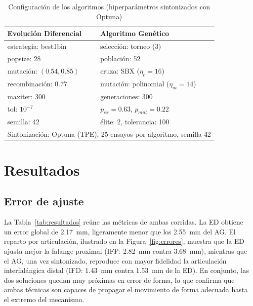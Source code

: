 \documentclass[conference]{IEEEtran}
\begin{document}
\begin{table}[htbp]
\caption{Configuración de los algoritmos (hiperparámetros sintonizados con Optuna)}
\begin{center}
\begin{tabular}{|l|l|}
\hline
\textbf{Evolución Diferencial} & \textbf{Algoritmo Genético} \\
\hline
estrategia: best1bin & selección: torneo (3) \\
\hline
popsize: 28 & población: 52 \\
\hline
mutación: $(0.54,0.85)$ & cruza: SBX ($\eta_c=16$) \\
\hline
recombinación: 0.77 & mutación: polinomial ($\eta_m=14$) \\
\hline
maxiter: 300 & generaciones: 300 \\
\hline
tol: $10^{-7}$ & $p_{cx}=0.63$, $p_{mut}=0.22$ \\
\hline
semilla: 42 & élite: 2, tolerancia: 100 \\
\hline
\multicolumn{2}{|l|}{Sintonización: Optuna (TPE), 25 ensayos por algoritmo, semilla 42} \\
\hline
\end{tabular}
\label{tab:config}
\end{center}
\end{table}

\section{Resultados}
\subsection{Error de ajuste}
La Tabla~\ref{tab:resultados} reúne las métricas de ambas corridas. La ED obtiene
un error global de 2.17~mm, ligeramente menor que los 2.55~mm del AG. El reparto
por articulación, ilustrado en la Figura~\ref{fig:errores}, muestra que la ED
ajusta mejor la falange proximal (IFP: 2.82~mm contra 3.68~mm), mientras que el
AG, una vez sintonizado, reproduce con mayor fidelidad la articulación
interfalángica distal (IFD: 1.43~mm contra 1.53~mm de la ED). En conjunto, las dos soluciones quedan
muy próximas en error de forma, lo que confirma que ambas técnicas son
capaces de propagar el movimiento de forma adecuada hasta el extremo del
mecanismo.
\end{document}
